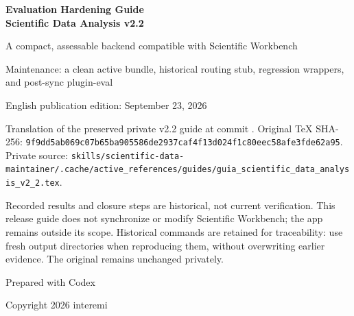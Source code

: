 \documentclass[11pt,a4paper]{article}
\newcommand{\code}[1]{\texttt{\detokenize{#1}}}
\begin{document}
\begin{titlepage}
\centering
\vspace*{1.0cm}
{\Huge\bfseries\color{titleblue} Evaluation Hardening Guide\\[0.15cm]
Scientific Data Analysis v2.2\par}
\vspace{0.65cm}
{\Large A compact, assessable backend compatible with Scientific Workbench\par}
\vspace{0.8cm}
{\large Maintenance: a clean active bundle, historical routing stub,
regression wrappers, and post-sync plugin-eval\par}
\vspace{0.8cm}
{\large English publication edition: September 23, 2026\par}
\vspace{0.5cm}
\begin{minipage}{0.93\textwidth}
\small\raggedright
Translation of the preserved private v2.2 guide at commit \code{83dd0a5}.
Original TeX SHA-256:
\nolinkurl{9f9dd5ab069c07b65ba905586de2937caf4f13d024f1c80eec58afe3fde62a95}.
Private source:
\nolinkurl{skills/scientific-data-maintainer/.cache/active_references/guides/guia_scientific_data_analysis_v2_2.tex}.

Recorded results and closure steps are historical, not current verification.
This release guide does not synchronize or modify Scientific Workbench;
the app remains outside its scope. Historical commands are retained for
traceability: use fresh output directories when reproducing them, without
overwriting earlier evidence. The original remains unchanged privately.
\end{minipage}
\vfill
{\large Prepared with Codex\par}
{\large Copyright 2026 interemi\par}
\end{titlepage}

\clearpage
{}
\fancyfoot[C]{\thepage}
\begin{abstract}
\code{scientific-data-analysis} v2.2 hardens evaluation on top of the v2.1
compact router and integrated v2.0 baseline. Its purpose remains reproducible,
non-destructive, traceable scientific and technical workflows. Packaging and
evaluator visibility change: temporary files, caches, and substantial historical
routing are excluded from the active bundle; representative regressions become
more visible to generic tools; and the guide advances to v2.2.

The skill remains the deterministic local backend, with Scientific Workbench
as the compatible app. v2.2 neither edits nor synchronizes the app.
\end{abstract}
\tableofcontents
\newpage
{}
\end{document}
